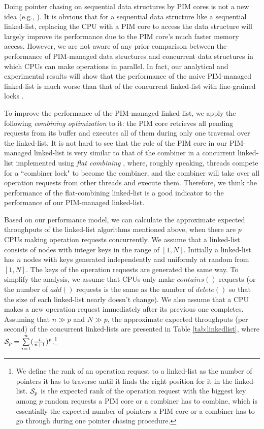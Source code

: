 Doing pointer chasing on sequential data structures by PIM cores is not a new idea
(e.g., \cite{hsieh2016accelerating, Ahn2015:2}).
It is obvious that for a sequential data structure like a sequential linked-list,
replacing the CPU with a PIM core to access the data structure will largely improve
its performance due to the PIM core's much faster memory access.
However, we are not aware of any prior comparison between the performance of
PIM-managed data structures and concurrent data structures
in which CPUs can make operations in parallel.
In fact, our analytical and experimental results will show that
the performance of the naive PIM-managed linked-list is much worse than
that of the concurrent linked-list with fine-grained locks \cite{Heller05}.

To improve the performance of the PIM-managed linked-list,
we apply the following \textit{combining optimization} to it:
the PIM core retrieves all pending requests from its buffer and
executes all of them during only one traversal over the linked-list.
It is not hard to see that the role of the PIM core in our PIM-managed linked-list
is very similar to that of the combiner in a concurrent linked-list implemented
using \textit{flat combining} \cite{Hendler10}, where, roughly speaking,
threads compete for a ``combiner lock" to become the combiner, and
the combiner will take over all operation requests from other threads and execute them.
Therefore, we think the performance of the flat-combining linked-list is a good indicator to
the performance of our PIM-managed linked-list.

Based on our performance model, we can calculate the approximate expected
throughputs of the linked-list algorithms mentioned above, 
when there are $p$ CPUs making operation requests concurrently.
We assume that a linked-list consists of nodes with integer keys in the range of $[1, N]$.
Initially a linked-list has $n$ nodes with keys generated independently
and uniformly at random from $[1, N]$.
The keys of the operation requests are generated the same way.
To simplify the analysis, we assume that CPUs only make $contains()$ requests
(or the number of $add()$ requests is the same as the number of $delete()$
so that the size of each linked-list nearly doesn't change).
We also assume that a CPU makes a new operation request immediately after
its previous one completes.
Assuming that $n \gg p$ and $N \gg p$, the approximate expected throughputs (per second) 
of the concurrent linked-lists are presented in Table \ref{tab:linkedlist}, 
where $\mathcal{S}_{p} = \sum\limits_{i=1}^{n} ({i \over n+1})^{p}$.\footnote{
We define the rank of an operation request to a linked-list as the number of pointers
it has to traverse until it finds the right position for it in the linked-list.
$\mathcal{S}_{p}$ is the expected rank of the operation request with the biggest key
among $p$ random requests a PIM core or a combiner has to combine,
which is essentially the expected number of pointers a PIM core or a combiner
has to go through during one pointer chasing procedure.}

